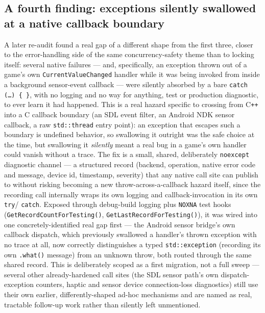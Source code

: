\subsection{A fourth finding: exceptions silently swallowed at a native callback boundary}

A later re-audit found a real gap of a different shape from the first three, closer to the
error-handling side of the same concurrency-safety theme than to locking itself: several
native failures --- and, specifically, an exception thrown out of a game's own
\texttt{CurrentValueChanged} handler while it was being invoked from inside a background
sensor-event callback --- were silently absorbed by a bare \texttt{catch (\ldots{}) \{ \}}, with
no logging and no way for anything, test or production diagnostic, to ever learn it had
happened. This is a real hazard specific to crossing from C\texttt{++} into a C callback
boundary (an SDL event filter, an Android NDK sensor callback, a raw \texttt{std::thread} entry
point): an exception that escapes such a boundary is undefined behavior, so swallowing it
outright was the safe choice at the time, but swallowing it \emph{silently} meant a real bug in
a game's own handler could vanish without a trace. The fix is a small, shared, deliberately
\texttt{noexcept} diagnostic channel --- a structured record (backend, operation, native
error code and message, device id, timestamp, severity) that any native call site can publish
to without risking becoming a new throw-across-a-callback hazard itself, since the recording
call internally wraps its own logging and callback-invocation in its own \texttt{try}/%
\texttt{catch}. Exposed through debug-build logging plus \texttt{NOXNA} test hooks
(\texttt{GetRecordCountForTesting()}, \texttt{GetLastRecordForTesting()}), it was wired into one
concretely-identified real gap first --- the Android sensor bridge's own callback dispatch,
which previously swallowed a handler's thrown exception with no trace at all, now correctly
distinguishes a typed \texttt{std::exception} (recording its own \texttt{.what()} message) from
an unknown throw, both routed through the same shared record. This is deliberately scoped as a
first migration, not a full sweep --- several other already-hardened call sites (the SDL sensor
path's own dispatch-exception counters, haptic and sensor device connection-loss diagnostics)
still use their own earlier, differently-shaped ad-hoc mechanisms and are named as real,
tractable follow-up work rather than silently left unmentioned.

